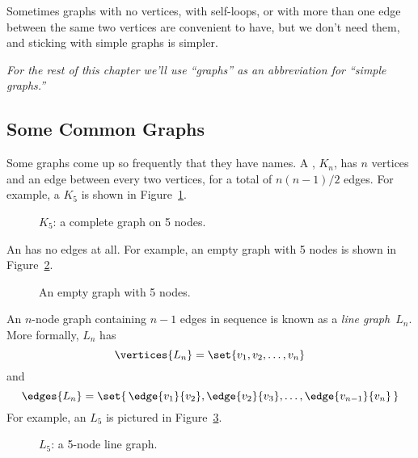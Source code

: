 Sometimes graphs with no vertices, with self-loops, or with more than one
edge between the same two vertices are convenient to have, but we don't
need them, and sticking with simple graphs is simpler. \smiley

\emph{For the rest of this chapter we'll use ``graphs'' as an abbreviation
  for ``simple graphs.''}

\subsection{Some Common Graphs}

Some graphs come up so frequently that they have names.  A
, $K_n$, has $n$ vertices and an edge between
every two vertices, for a total of $n(n-1)/2$ edges.  For example,
a $K_5$ is shown in Figure~\ref{fig:K_5}.

\begin{figure}


\caption{$K_5$: a complete graph on 5 nodes.}
\label{fig:K_5}
\end{figure}

An  has no edges at all.  For example, an empty
graph with 5 nodes is shown in Figure~\ref{fig:graph_empty_5}.

\begin{figure}


\caption{An empty graph with 5 nodes.}
\label{fig:graph_empty_5}
\end{figure}

An $n$-node graph containing $n - 1$ edges in sequence is known as
a \emph{line graph}~$L_n$.  More formally, $L_n$ has
\begin{equation*}
    \vertices{L_n} = \set{ v_1, v_2, \dots, v_n }
\end{equation*}
and
\begin{equation*}
    \edges{L_n} = \set{\, \edge{v_1}{v_2}, \edge{v_2}{v_3}, \dots,
    \edge{v_{n-1}}{v_n} \, }
\end{equation*}
For example, an $L_5$ is pictured in Figure~\ref{fig:graph_L_5}.

\begin{figure}


\caption{$L_5$: a 5-node line graph.}

\label{fig:graph_L_5}

\end{figure}


